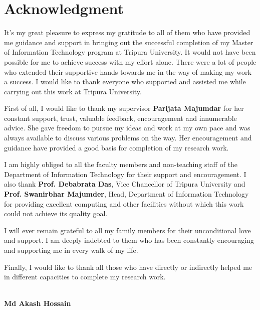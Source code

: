 \sloppy
\chapter*{\centering Acknowledgment}
It's my great pleasure to express my gratitude to all of them who have provided me guidance and support in bringing out the successful completion of my Master of Information Technology program at Tripura University. It would not have been possible for me to achieve success with my effort alone. There were a lot of people who extended their supportive hands towards me in the way of making my work a success. I would like to thank everyone who supported and assisted me while carrying out this work at Tripura University.

\noindent First of all, I would like to thank my supervisor {\bf Parijata Majumdar} for her constant support, trust, valuable feedback, encouragement and innumerable advice. She gave freedom to pursue my ideas and work at my own pace and was always available to discuss various problems on the way. Her encouragement and guidance have provided a good basis for completion of my research work.

\noindent I am highly obliged to all the faculty members and non-teaching staff of the Department of Information Technology for their support and encouragement. I also thank {\bf Prof. Debabrata Das}, Vice Chancellor of Tripura University and {\bf Prof. Swanirbhar Majumder}, Head, Department of Information Technology for providing excellent computing and other facilities without which this work could not achieve its quality goal.

\noindent I will ever remain grateful to all my family members for their unconditional love and support. I am deeply indebted to them who has been constantly encouraging and supporting me in every walk of my life.

\noindent Finally, I would like to thank all those who have directly or indirectly helped me in different capacities to complete my research work. \\ \\
\begin{flushright}
{\bf Md Akash Hossain}
\end{flushright}
